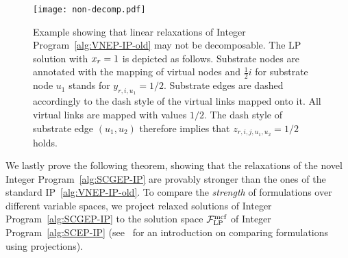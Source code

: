 \documentclass[10pt, conference, letterpaper]{IEEEtran}
\begin{document}
\begin{figure}[tbhp]
\centering
\texttt{[image: non-decomp.pdf]}
\caption{Example showing that linear relaxations of Integer Program~\ref{alg:VNEP-IP-old} may not be decomposable. The LP solution with $x_r=1$ is depicted as follows. Substrate nodes are annotated with the mapping of virtual nodes and $\frac{1}{2}i$ for substrate node $u_1$ stands for $y_{r,i,u_1} = 1/2$. Substrate edges are dashed accordingly to the dash style of the virtual links mapped onto it. All virtual links are mapped with values $1/2$. The dash style of substrate edge $(u_1,u_2)$ therefore implies that $z_{r,i,j,u_1,u_2} = 1/2$ holds.}
\label{fig:non-decomp}
\end{figure}


We lastly prove the following theorem, showing that the relaxations of the novel Integer Program~\ref{alg:SCGEP-IP} are provably stronger than the ones of the standard IP~\ref{alg:VNEP-IP-old}. To compare the \emph{strength} of formulations over different variable spaces, we project relaxed solutions of Integer Program~\ref{alg:SCGEP-IP} to the solution space $\mathcal{F}^{\textnormal{mcf}}_{\textnormal{LP}}$ of Integer Program~\ref{alg:SCEP-IP} (see~\cite{balas2005projection} for an introduction on comparing formulations using projections).
\end{document}
